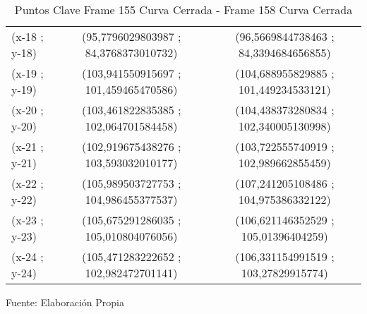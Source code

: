 \begin{table}[htbp]
\begin{tabular}{|l|c|c|}
		(x-18 ; y-18) & (95,7796029803987 ; 84,3768373010732) & (96,5669844738463 ; 84,3394684656855) \\
		(x-19 ; y-19) & (103,941550915697 ; 101,459465470586) & (104,688955829885 ; 101,449234533121) \\
		(x-20 ; y-20) & (103,461822835385 ; 102,064701584458) & (104,438373280834 ; 102,340005130998) \\
		(x-21 ; y-21) & (102,919675438276 ; 103,593032010177) & (103,722555740919 ; 102,989662855459) \\
		(x-22 ; y-22) & (105,989503727753 ; 104,986455377537) & (107,241205108486 ; 104,975386332122) \\
		(x-23 ; y-23) & (105,675291286035 ; 105,010804076056) & (106,621146352529 ; 105,01396404259) \\
		(x-24 ; y-24) & (105,471283222652 ; 102,982472701141) & (106,331154991519 ; 103,27829915774) \\ \hline
	\end{tabular}%
	\caption{Puntos Clave Frame 155 Curva Cerrada - Frame 158 Curva Cerrada }
	\footnotesize Fuente: Elaboración Propia
	\label{checkerporcentage3}
\end{table}%
\restoregeometry

\clearpage
\restoregeometry
{}
\text{  }
\linebreak[4] \null
\linebreak[4] \null
\linebreak[4] \null
\linebreak[4] \null 

